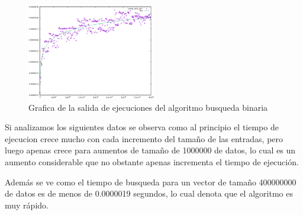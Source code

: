 \begin{figure}[ht]
  \centering
  \includegraphics[width=0.5\textwidth]{./Imagenes/binaria_ajustada.png}
  \caption{Grafica de la salida de ejecuciones del algoritmo busqueda binaria}
\end{figure}

Si analizamos los siguientes datos se observa como al principio el tiempo de ejecucion crece mucho con cada incremento del tamaño de las entradas, pero luego apenas crece para aumentos de tamaño de 1000000 de datos, lo cual es un aumento considerable que no obstante apenas incrementa el tiempo de ejecución.

Además se ve como el tiempo de busqueda para un vector de tamaño 400000000 de datos es de menos de 0.0000019 segundos, lo cual denota que el algoritmo es muy rápido.

